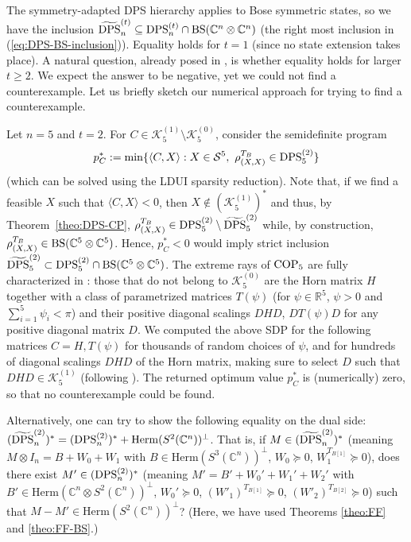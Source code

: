 \documentclass[11pt]{article}
\newcommand{\R}{\ensuremath{\mathbb{R}}}   %
\newcommand{\C}{\ensuremath{\mathbb{C}}} %
\newcommand{\MS}{{\mathcal S}}
\newcommand{\MK}{{\mathcal K}}
\newcommand{\Herm}{\mathrm{Herm}}
\newcommand{\COP}{\text{\rm COP}}
\newcommand{\DPS}{\text{\rm DPS}}
\newcommand{\tilDPS}{\widetilde {\DPS}}
\newcommand{\ot}{\otimes}
\newcommand{\BS}{\text{\rm BS}}
\theoremstyle{plain}
\begin{document}
\medskip
The symmetry-adapted DPS hierarchy applies to Bose symmetric states, so we have the inclusion 
 $\tilDPS^{(t)}_n\subseteq \DPS^{(t)}_n\cap \BS(\C^n\ot \C^n)$ (the right most inclusion in (\ref{eq:DPS-BS-inclusion})). Equality holds for $t=1$ (since no state extension takes place). A natural question, already posed in \cite[Question 8.20]{GNP_2025},  is whether equality holds for larger $t\ge 2$. 
We expect the answer to be negative, yet we could not find a counterexample.  Let us briefly sketch our numerical approach for trying to  find a counterexample.

Let $n=5$ and $t=2$. For $C\in \MK^{(1)}_5\setminus \MK^{(0)}_5$,  consider the   semidefinite program
$$p^*_C:=\min\{\langle C, X\rangle: X\in \MS^5,\  \rho_{(X,X)}^{T_B} \in \DPS^{(2)}_5\}
$$
(which can be solved using the LDUI sparsity reduction). Note that, if we find a feasible $X$ such that $\langle C,X\rangle <0$, then $X\not\in (\MK^{(1)}_5)^*$ and thus, by Theorem~\ref{theo:DPS-CP}, $\rho_{(X,X)}^{T_B}\in \DPS^{(2)}_5\setminus \tilDPS^{(2)}_5$ while, by construction, $\rho_{(X,X)}^{T_B}\in\BS(\C^5\ot\C^5)$. Hence,  $p_C^*<0$ would imply strict inclusion  $\tilDPS^{(2)}_5\subset \DPS^{(2)}_5\cap \BS(\C^5\ot \C^5)$. The extreme rays of $\COP_5$ are fully characterized in \cite{Hildebrand-COP5}: those that do not belong to $\MK^{(0)}_5$ are the Horn matrix $H$ together with a class of parametrized matrices $T(\psi)$ (for $\psi\in \R^5$, $\psi>0$ and $\sum_{i=1}^5\psi_i<\pi$) and their positive diagonal scalings $DHD$, $DT(\psi)D$ for any positive diagonal matrix $D$. We computed the above SDP  for the following matrices $C=H, T(\psi)$ for thousands of random choices of $\psi$, and for hundreds of diagonal scalings $DHD$ of the Horn matrix, making sure to select $D$ such that $DHD\in \MK^{(1)}_5$ (following \cite[Theorem 4]{Laurent-Vargas_2023}).
The returned optimum value $p_C^*$ is (numerically) zero, so that no counterexample could be found.

Alternatively, one can try to show the following equality on the dual side: $\smash{(\tilDPS^{(2)}_n)^*}=(\DPS^{(2)}_n)^* + \Herm(S^2(\C^n))^\perp$.
That is, if  $M\in  {(\tilDPS^{(2)}_n)^*}$  (meaning 
$M\ot I_n= B+W_0+W_1$ with $B\in \Herm(S^3(\C^n))^\perp$, $W_0\succeq 0$,  $W_1^{T_{B[1]}}\succeq 0$), does there exist $M'\in (\DPS^{(2)}_n)^*$ (meaning 
$M'=B'+W_0'+W_1'+W_2'$ with $B'\in  \Herm(\C^n\ot S^2(\C^n))^\perp$, $W_0'\succeq 0$, 
$(W'_1)^{T_{B[1]}}\succeq 0$, $(W'_2)^{T_{B[2]}}\succeq 0$)  such that $M-M'\in \Herm(S^2(\C^n))^\perp$? 
(Here, we have used Theorems \ref{theo:FF} and \ref{theo:FF-BS}.)
\end{document}
